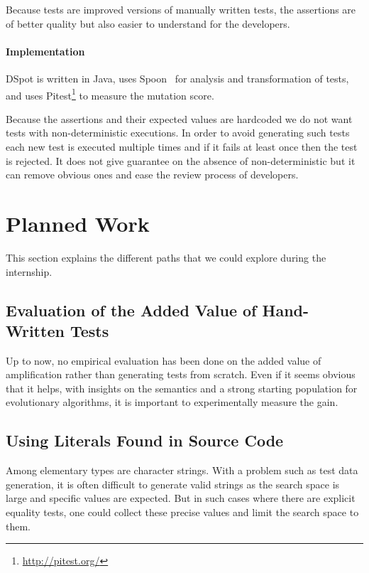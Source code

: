 \documentclass[11pt]{sdm}
\newcommand{\dspot}{DSpot\xspace}
\begin{document}
Because tests are improved versions of manually written tests, the assertions are of better quality but also easier to understand for the developers.

\paragraph{Implementation}
\dspot{} is written in Java, uses Spoon~\cite{pawlak2016spoon} for analysis and transformation of tests, and uses Pitest\footnote{\url{http://pitest.org/}} to measure the mutation score.

Because the assertions and their expected values are hardcoded we do not want tests with non-deterministic executions.
In order to avoid generating such tests each new test is executed multiple times and if it fails at least once then the test is rejected.
It does not give guarantee on the absence of non-deterministic but it can remove obvious ones and ease the review process of developers.


\section{Planned Work}
\label{planned}
This section explains the different paths that we could explore during the internship.

\subsection{Evaluation of the Added Value of Hand-Written Tests}
\label{evaluation}
Up to now, no empirical evaluation has been done on the added value of amplification rather than generating tests from scratch.
Even if it seems obvious that it helps, with insights on the semantics and a strong starting population for evolutionary algorithms, it is important to experimentally measure the gain.


\subsection{Using Literals Found in Source Code}
\label{mutation}
Among elementary types are character strings.
With a problem such as test data generation, it is often difficult to generate valid strings as the search space is large and specific values are expected.
But in such cases where there are explicit equality tests, one could collect these precise values and limit the search space to them.
\end{document}
